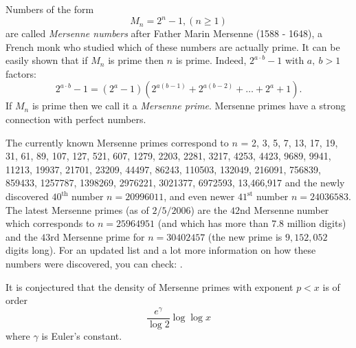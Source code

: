 \documentclass[12pt]{article}
\begin{document}
Numbers of the form
\[
M_n = 2^n - 1, (n \geq 1)
\]
are called \emph{Mersenne numbers} after Father Marin Mersenne (1588 - 1648), a French monk who studied which of these numbers are actually prime. It can be easily shown that if $M_n$ is prime then $n$ is prime. Indeed, $2^{a\cdot b}-1$ with $a,\ b >1$ factors:
$$2^{a\cdot b}-1=(2^a-1)(2^{a(b-1)}+2^{a(b-2)}+\ldots+2^a+1).$$
If $M_n$ is prime then we call it a \emph{Mersenne prime}. Mersenne primes have a strong connection with perfect numbers.

The currently known Mersenne primes correspond to $n$ = 2, 3, 5, 7, 13, 17, 19, 31, 61, 89, 107, 127, 521, 607, 1279, 2203, 2281, 3217, 4253, 4423, 9689, 9941, 11213, 19937, 21701, 23209, 44497, 86243, 110503, 132049, 216091, 756839, 859433, 1257787, 1398269, 2976221, 3021377, 6972593, 13,466,917 and the newly discovered $40^{\operatorname{th}}$ number $n=20996011$, and even newer $41^{\operatorname{st}}$ number $n=24036583$. The latest Mersenne primes (as of $2/5/2006$) are the $42$nd Mersenne number which corresponds to $n=25964951$ (and which has more than $7.8$ million digits) and the $43$rd Mersenne prime for $n=30402457$ (the new prime is $9,152,052$ digits long). For an updated list and a lot more information on how these numbers were discovered, you can check: .

It is conjectured that the density of Mersenne primes with exponent $p<x$ is of order
$$ \frac{e^{\gamma}}{\log 2} \log \log x $$
where $\gamma$ is Euler's constant.
\end{document}
